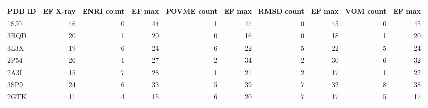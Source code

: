 \begin{tabular}{lrrrrrrrrr}
\hline
 PDB ID   &   EF X-ray &   ENRI count &   EF max &   POVME count &   EF max &   RMSD count &   EF max &   VOM count &   EF max \\
\hline
 1SJ0     &         46 &            0 &       44 &             1 &       47 &            0 &       45 &           0 &       45 \\
 3BQD     &         20 &            1 &       20 &             0 &       16 &            0 &       18 &           1 &       20 \\
 3L3X     &         19 &            6 &       24 &             6 &       22 &            5 &       22 &           5 &       24 \\
 2P54     &         26 &            1 &       27 &             2 &       34 &            2 &       30 &           6 &       32 \\
 2A3I     &         15 &            7 &       28 &             1 &       21 &            2 &       17 &           1 &       22 \\
 3SP9     &         24 &            6 &       33 &             5 &       39 &            7 &       32 &           8 &       38 \\
 2GTK     &         11 &            4 &       15 &             6 &       20 &            7 &       17 &           5 &       17 \\
\hline
\end{tabular}
